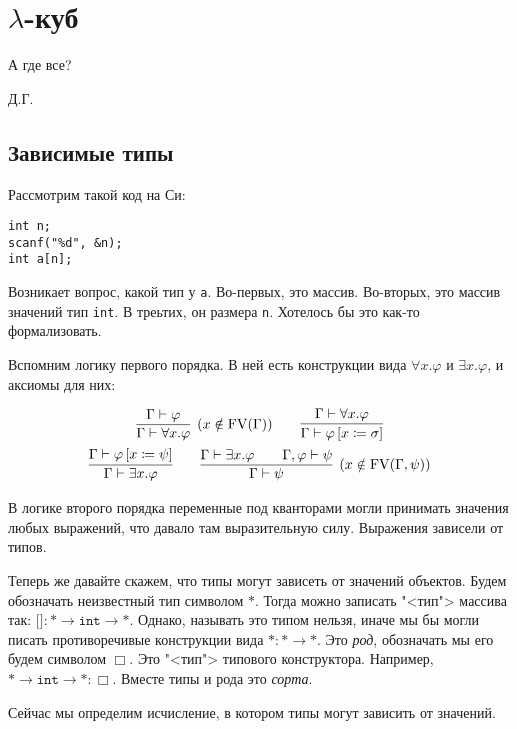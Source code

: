 \section{\texorpdfstring{$\lambda$-куб}{Lambda cube}}
\epigraph{А где все?}{Д.Г.}

\subsection{\texorpdfstring{Зависимые типы}{Depended types}}

Рассмотрим такой код на Си:
\begin{verbatim}
int n;
scanf("%d", &n);
int a[n];
\end{verbatim}
Возникает вопрос, какой тип у \texttt{a}.
Во-первых, это массив. Во-вторых, это массив значений тип \texttt{int}. В треьтих, он размера \texttt{n}.
Хотелось бы это как-то формализовать.

Вспомним логику первого порядка.
В ней есть конструкции вида $\forall x . \varphi$ и $\exists x . \varphi$, и аксиомы для них: %
\begin{@empty}
\inferspacing
\begin{gather*}
    \infer[(x \notin \FV(\Gamma))]{\Gamma \vdash \forall x . \varphi}{\Gamma \vdash \varphi} \qquad
    \infer{\Gamma \vdash \varphi \left[x \coloneqq \sigma\right]}{\Gamma \vdash \forall x . \varphi} \\
    \infer{\Gamma \vdash \exists x . \varphi}{\Gamma \vdash \varphi \left[x \coloneqq \psi\right]} \qquad
    \infer[(x \notin \FV(\Gamma, \psi))]{\Gamma \vdash \psi}{\Gamma \vdash \exists x . \varphi && \Gamma, \varphi \vdash \psi}
\end{gather*}
\end{@empty}%
В логике второго порядка переменные под кванторами могли принимать значения любых выражений, что давало там выразительную силу.
Выражения зависели от типов.

Теперь же давайте скажем, что типы могут зависеть от значений объектов.
Будем обозначать неизвестный тип символом $*$.
Тогда можно записать "<тип"> массива так: $\texttt{[]}: * \to \texttt{int} \to *$.
Однако, называть это типом нельзя, иначе мы бы могли писать противоречивые конструкции вида $* : * \to *$.
Это \emph{род}, обозначать мы его будем символом $\Box$. Это "<тип"> типового конструктора.
Например, $* \to \texttt{int} \to * : \Box$.
Вместе типы и рода это \emph{сорта}.

Сейчас мы определим исчисление, в котором типы могут зависить от значений.

